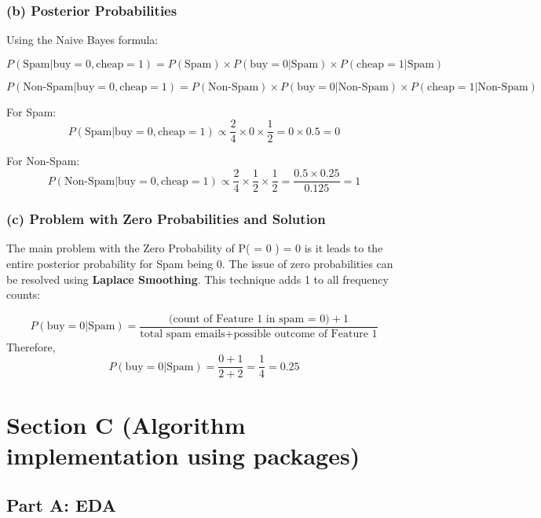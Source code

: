 \documentclass{article}
\begin{document}
\subsubsection*{(b) Posterior Probabilities}

\hspace{10pt}
Using the Naive Bayes formula:

\[
P(\text{Spam} | \text{buy} = 0, \text{cheap} = 1) = P(\text{Spam}) \times P(\text{buy} = 0 | \text{Spam}) \times P(\text{cheap} = 1 | \text{Spam})
\]

\[
P(\text{Non-Spam} | \text{buy} = 0, \text{cheap} = 1) = P(\text{Non-Spam}) \times P(\text{buy} = 0 | \text{Non-Spam}) \times P(\text{cheap} = 1 | \text{Non-Spam})
\]

For Spam:
\[
P(\text{Spam} | \text{buy} = 0, \text{cheap} = 1) \propto \frac{2}{4} \times 0 \times \frac{1}{2} = 0 \times 0.5 = 0
\]

For Non-Spam:
\[
P(\text{Non-Spam} | \text{buy} = 0, \text{cheap} = 1) \propto \frac{2}{4} \times \frac{1}{2} \times \frac{1}{2} = \frac{0.5 \times 0.25}{0.125} = 1
\]

\subsubsection*{(c) Problem with Zero Probabilities and Solution}
The main problem with the Zero Probability of P( = 0 \text{\textbar} ) = 0 is it leads to the entire posterior probability for Spam being 0.
The issue of zero probabilities can be resolved using \textbf{Laplace Smoothing}. This technique adds 1 to all frequency counts:

\[
P(\text{buy} = 0 | \text{Spam}) = \frac{\text{(count of Feature 1 in spam = 0)} + 1}{\text{total spam emails} + \text{possible outcome of Feature 1}}
\]
Therefore,
\[
P(\text{buy} = 0 | \text{Spam}) = \frac{0 + 1}{2 + 2} = \frac{1}{4} = 0.25
\]


\vspace{50pt} %
\section{Section C (Algorithm implementation using packages)}
\subsection*{Part A: EDA}
\end{document}
